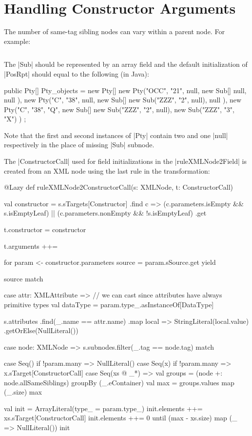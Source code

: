 \section{Handling Constructor Arguments}
\label{sec:AppendixConstructorArguments}

The number of same-tag sibling nodes can vary within a parent node.
For example:

\inputminted[fontsize=\fontsize{8}{8},linenos,numbersep=5pt,frame=lines,framesep=2mm]{xml}{listings/variable-siblings.xml}

The \Scala|Sub| should be represented by an array field and the default initialization of \Scala|PosRpt| should equal to the following (in Java):
%
\begin{javacode}
public Pty[] Pty_objects = new Pty[] { 
  new Pty("OCC", "21", null, new Sub[] { null, null }),
  new Pty("C", "38", null, new Sub[] { new Sub("ZZZ", "2", null), null }),
  new Pty("C", "38", "Q", new Sub[] { new Sub("ZZZ", "2", null), new Sub("ZZZ", "3", "X") }) 
};
\end{javacode}
%
Note that the first and second instances of \Scala|Pty| contain two and one \Scala|null| respectively in the place of missing \Scala|Sub| subnode.

The \Scala|ConstructorCall| used for field initializations in the \Scala|ruleXMLNode2Field| is created from an XML node using the last rule in the transformation:
%
\begin{scalacode}
@Lazy
def ruleXMLNode2ConstructorCall(s: XMLNode, t: ConstructorCall) {
  val constructor = s.sTargets[Constructor]
    .find { c =>
      (c.parameters.isEmpty && s.isEmptyLeaf) ||
      (c.parameters.nonEmpty && !s.isEmptyLeaf)
    }
    .get

  t.constructor = constructor

  t.arguments ++= {
    for {
      param <- constructor.parameters
      source = param.sSource.get
    } yield {
      source match {
        case attr: XMLAttribute =>
          // we can cast since attributes have always primitive types
          val dataType = param.type_.asInstanceOf[DataType]

          s.attributes
            .find(_.name == attr.name)
            .map { local => StringLiteral(local.value) }
            .getOrElse(NullLiteral())

        case node: XMLNode =>
          s.subnodes.filter(_.tag == node.tag) match {

            case Seq() if !param.many =>
              NullLiteral()
            case Seq(x) if !param.many =>
              x.sTarget[ConstructorCall]
            case Seq(xs @ _*) =>
              val groups = (node +: node.allSameSiblings) groupBy (_.eContainer)
              val max = groups.values map (_.size) max
              
              val init = ArrayLiteral(type_ = param.type_)
              init.elements ++= xs.sTarget[ConstructorCall]
              init.elements ++= 0 until (max - xs.size) map (_ => NullLiteral())
              init
          }
      }
    }
  }
}
\end{scalacode}  

